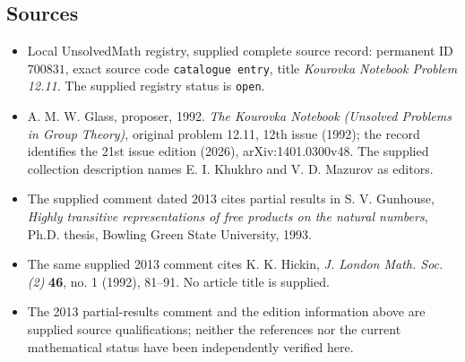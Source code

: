 \documentclass[11pt]{article}
\begin{document}
\subsection{Sources}
\begin{itemize}
\item Local UnsolvedMath registry, supplied complete source record: permanent ID \(700831\), exact source code \texttt{catalogue entry}, title \emph{Kourovka Notebook Problem 12.11}. The supplied registry status is \texttt{open}.
\item A. M. W. Glass, proposer, 1992. \emph{The Kourovka Notebook (Unsolved Problems in Group Theory)}, original problem 12.11, 12th issue (1992); the record identifies the 21st issue edition (2026), arXiv:1401.0300v48. The supplied collection description names E. I. Khukhro and V. D. Mazurov as editors.
\item The supplied comment dated 2013 cites partial results in S. V. Gunhouse, \emph{Highly transitive representations of free products on the natural numbers}, Ph.D. thesis, Bowling Green State University, 1993.
\item The same supplied 2013 comment cites K. K. Hickin, \emph{J. London Math. Soc. (2)} \textbf{46}, no. 1 (1992), 81--91. No article title is supplied.
\item The 2013 partial-results comment and the edition information above are supplied source qualifications; neither the references nor the current mathematical status have been independently verified here.
\end{itemize}
\end{document}
